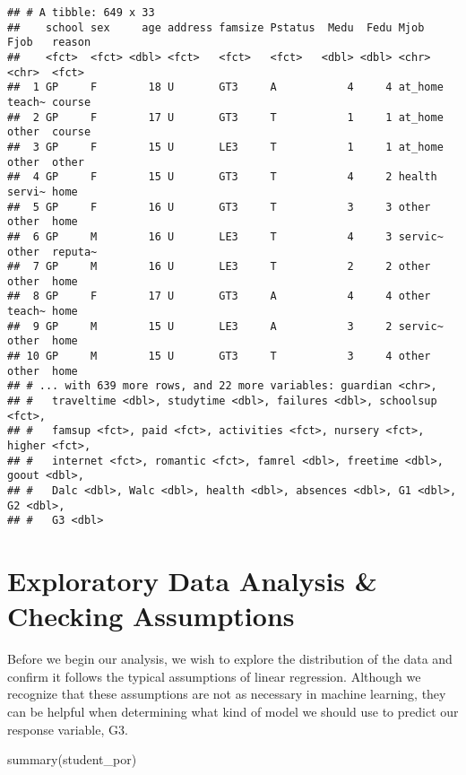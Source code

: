 \documentclass[
]{article}
\newenvironment{Shaded}{\begin{snugshade}}{\end{snugshade}}
\newcommand{\FunctionTok}[1]{\textcolor[rgb]{0.00,0.00,0.00}{#1}}
\newcommand{\NormalTok}[1]{#1}
\begin{document}
\begin{verbatim}
## # A tibble: 649 x 33
##    school sex     age address famsize Pstatus  Medu  Fedu Mjob    Fjob   reason 
##    <fct>  <fct> <dbl> <fct>   <fct>   <fct>   <dbl> <dbl> <chr>   <chr>  <fct>  
##  1 GP     F        18 U       GT3     A           4     4 at_home teach~ course 
##  2 GP     F        17 U       GT3     T           1     1 at_home other  course 
##  3 GP     F        15 U       LE3     T           1     1 at_home other  other  
##  4 GP     F        15 U       GT3     T           4     2 health  servi~ home   
##  5 GP     F        16 U       GT3     T           3     3 other   other  home   
##  6 GP     M        16 U       LE3     T           4     3 servic~ other  reputa~
##  7 GP     M        16 U       LE3     T           2     2 other   other  home   
##  8 GP     F        17 U       GT3     A           4     4 other   teach~ home   
##  9 GP     M        15 U       LE3     A           3     2 servic~ other  home   
## 10 GP     M        15 U       GT3     T           3     4 other   other  home   
## # ... with 639 more rows, and 22 more variables: guardian <chr>,
## #   traveltime <dbl>, studytime <dbl>, failures <dbl>, schoolsup <fct>,
## #   famsup <fct>, paid <fct>, activities <fct>, nursery <fct>, higher <fct>,
## #   internet <fct>, romantic <fct>, famrel <dbl>, freetime <dbl>, goout <dbl>,
## #   Dalc <dbl>, Walc <dbl>, health <dbl>, absences <dbl>, G1 <dbl>, G2 <dbl>,
## #   G3 <dbl>
\end{verbatim}

\hypertarget{exploratory-data-analysis-checking-assumptions}{%
\section{Exploratory Data Analysis \& Checking
Assumptions}\label{exploratory-data-analysis-checking-assumptions}}

Before we begin our analysis, we wish to explore the distribution of the
data and confirm it follows the typical assumptions of linear
regression. Although we recognize that these assumptions are not as
necessary in machine learning, they can be helpful when determining what
kind of model we should use to predict our response variable, G3.

\begin{Shaded}
\begin{Highlighting}[]
\FunctionTok{summary}\NormalTok{(student\_por)}
\end{Highlighting}
\end{Shaded}
\end{document}
